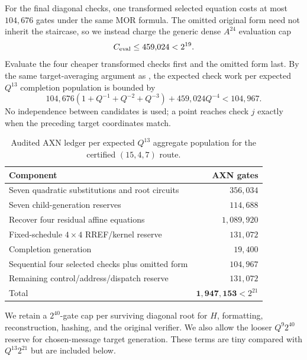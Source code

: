 \documentclass[11pt]{article}
\begin{document}
For the final diagonal checks, one transformed selected equation costs at
most $104{,}676$ gates under the same MOR formula.  The omitted original form
need not inherit the staircase, so we instead charge the generic dense
$A^{24}$ evaluation cap
\begin{equation}
 C_{\rm eval}\le459{,}024<2^{19}.                    \label{eq:jg-eval-gates}
\end{equation}
Evaluate the four cheaper transformed checks first and the omitted form last.
By the same target-averaging argument as , the
expected check work per expected $Q^{13}$ completion population is bounded by
\begin{equation}
 104{,}676(1+Q^{-1}+Q^{-2}+Q^{-3})
   +459{,}024Q^{-4}
 <104{,}967.                                         \label{eq:jg-sequential-checks}
\end{equation}
No independence between candidates is used; a point reaches check $j$ exactly
when the preceding target coordinates match.

\begin{table}[t]
\centering
\caption{Audited AXN ledger per expected $Q^{13}$ aggregate population for
the certified $(15,4,7)$ route.}
\label{tab:jg-redesign-ledger}
\small
\begin{tabular}{@{}l r@{}}
\toprule
Component & AXN gates\\
\midrule
Seven quadratic substitutions and root circuits & $356{,}034$\\
Seven child-generation reserves & $114{,}688$\\
Recover four residual affine equations & $1{,}089{,}920$\\
Fixed-schedule $4\times4$ RREF/kernel reserve & $131{,}072$\\
Completion generation & $19{,}400$\\
Sequential four selected checks plus omitted form & $104{,}967$\\
Remaining control/address/dispatch reserve & $131{,}072$\\
\midrule
Total & $\mathbf{1{,}947{,}153}<2^{21}$\\
\bottomrule
\end{tabular}
\end{table}

We retain a $2^{40}$-gate cap per surviving diagonal root for $H$, formatting,
reconstruction, hashing, and the original verifier.  We also allow the looser
$Q^9 2^{40}$ reserve for chosen-message target generation.  These terms are
tiny compared with $Q^{13}2^{21}$ but are included below.
\end{document}
